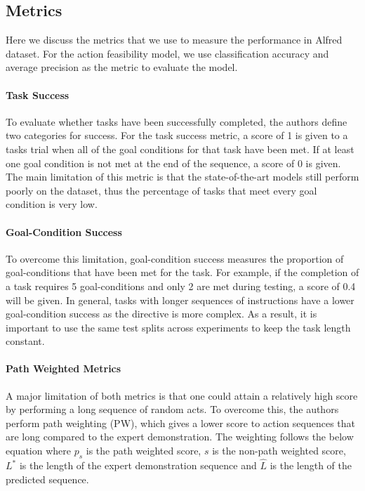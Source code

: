 \documentclass[11pt,a4paper]{article}
\begin{document}
\subsection{Metrics}
Here we discuss the metrics that we use to measure the performance in Alfred dataset. For the action feasibility model, we use classification accuracy and average precision as the metric to evaluate the model.

\paragraph{Task Success} To evaluate whether tasks have been successfully completed, the authors define two categories for success. For the task success metric, a score of 1 is given to a tasks trial when all of the goal conditions for that task have been met. If at least one goal condition is not met at the end of the sequence, a score of 0 is given. The main limitation of this metric is that the state-of-the-art models still perform poorly on the dataset, thus the percentage of tasks that meet every goal condition is very low.

\paragraph{Goal-Condition Success} To overcome this limitation, goal-condition success measures the proportion of goal-conditions that have been met for the task. For example, if the completion of a task requires 5 goal-conditions and only 2 are met during testing, a score of 0.4 will be given. In general, tasks with longer sequences of instructions have a lower goal-condition success as the directive is more complex. As a result, it is important to use the same test splits across experiments to keep the task length constant.

\paragraph{Path Weighted Metrics} A major limitation of both metrics is that one could attain a relatively high score by performing a long sequence of random acts. To overcome this, the authors perform path weighting (PW), which gives a lower score to action sequences that are long compared to the expert demonstration. The weighting follows the below equation where $p_s$ is the path weighted score, $s$ is the non-path weighted score, $L^*$ is the length of the expert demonstration sequence and $\hat{L}$ is the length of the predicted sequence.
\end{document}
